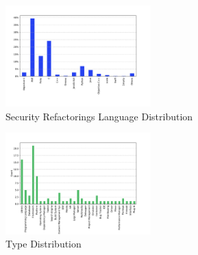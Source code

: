 \documentclass[10pt,conference]{IEEEtran}
\begin{document}

\begin{figure}[h]
 	\centering
 	\includegraphics[width=0.5\textwidth]{figures/language_dist.pdf}
 	\caption{Security Refactorings Language Distribution}
	\label{fig:lang}
\end{figure}

\begin{figure}[h]
 	\centering
 	\includegraphics[width=0.5\textwidth]{figures/type_dist.pdf}
 	\caption{Type Distribution}
	\label{fig:type}
\end{figure}
\end{document}
